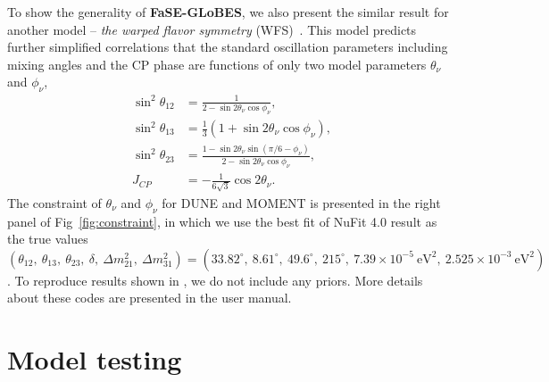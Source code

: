 \documentclass[aps,prd,nofootinbib,preprint]{revtex4}
\begin{document}


To show the generality of \textbf{FaSE-GLoBES}, we also present the similar result for another model -- \textit{the warped flavor symmetry} (WFS)~\cite{Chen:2015jta}. This model predicts further simplified correlations that the standard oscillation parameters including mixing angles and the CP phase are functions of only two model parameters $\theta_\nu$ and $\phi_\nu$,
\begin{align}\label{eq:WFS}
\sin^2\theta_{12}&=\frac{1}{2-\sin2\theta_{\nu}\cos\phi_\nu},\nonumber\\
\sin^2\theta_{13}&=\frac{1}{3}(1+\sin2\theta_\nu\cos\phi_\nu),\nonumber\\
\sin^2\theta_{23}&=\frac{1-\sin2\theta_\nu\sin(\pi/6-\phi_\nu)}{2-\sin2\theta_\nu\cos\phi_\nu},\nonumber\\
J_{CP}&=-\frac{1}{6\sqrt{3}}\cos2\theta_\nu.
\end{align}
The constraint of $\theta_\nu$ and $\phi_\nu$ for DUNE and MOMENT is presented in the right panel of Fig~\ref{fig:constraint}, in which we use the best fit of NuFit 4.0 result as the true values $(\theta_{12},~\theta_{13},~\theta_{23},~\delta,~\Delta m_{21}^2,~\Delta m_{31}^2)=(33.82^\circ,~8.61^\circ,~49.6^\circ,~215^\circ,~7.39\times10^{-5}~\text{eV}^2,~2.525\times10^{-3}~\text{eV}^2)$. To reproduce results shown in \cite{Chatterjee:2017xkb}, we do not include any priors. More details about these codes are presented in the user manual. 


\section{Model testing}
\end{document}
